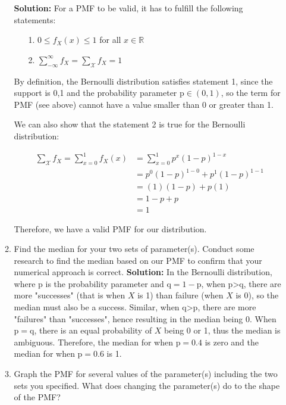 \documentclass{article}\usepackage[]{graphicx}\usepackage[]{color}
\begin{document}
\begin{enumerate}
\begin{enumerate}
	\textbf{Solution:} For a PMF to be valid, it has to fulfill the following statements:
	\begin{enumerate}
	\item[1.] $0 \leq f_{X}(x) \leq 1$ for all $x \in \mathbb{R}$
	\item[2.] $ \sum_{-\infty}^{\infty} f_{X} = \sum_{\mathcal{X}}f_{X} = 1$
	\end{enumerate}
	
	By definition, the Bernoulli distribution satisfies statement 1, since the support is {0,1} and the probability parameter $\mathrm{p \in (0,1)}$, so the term for PMF (see above) cannot have a value smaller than 0 or greater than 1.
	
	We can also show that the statement 2 is true for the Bernoulli distribution:
	
	\begin{align*}
	  \sum_{\mathcal{X}}f_{X} = \sum_{x = 0}^{1}f_{X}(x) &= \sum_{x = 0}^{1}p^{x}(1-p)^{1-x}\\
	  &= p^{0}(1-p)^{1-0} +p^{1}(1-p)^{1-1}\\
	  &= (1)(1-p) + p(1)\\
	  &= 1-p+p\\
	  &= 1
	\end{align*}
	
	Therefore, we have a valid PMF for our distribution.
	
	\item Find the median for your two sets of parameter(s). Conduct some research 
	to find the median based on our PMF to confirm that your numerical approach is
	correct. 
	\textbf{Solution:} In the Bernoulli distribution, where p is the probability parameter and $\mathrm{q = 1 - p}$, when p\textgreater q, there are more "successes" (that is when $X$ is 1) than failure (when $X$ is 0), so the median must also be a success. Similar, when q\textgreater p, there are more "failures" than "successes", hence resulting in the median being 0. When $\mathrm{p = q}$, there is an equal probability of $X$ being 0 or 1, thus the median is ambiguous. Therefore, the median for when $\mathrm{p = 0.4}$ is zero and the median for when $\mathrm{p = 0.6}$ is 1.
	\item \label{q3PMF} Graph the PMF for several values of the parameter(s) 
	including the two sets you specified. What does changing the parameter(s) do 
	to the shape of the PMF?
	

\end{enumerate}
\end{enumerate}
\end{document}
